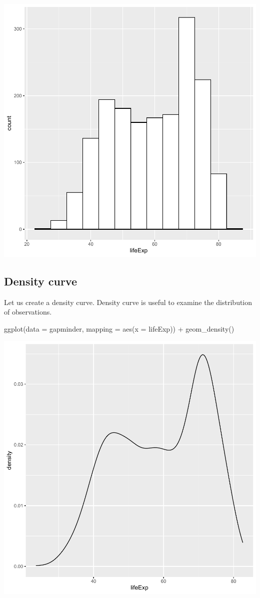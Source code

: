 \documentclass[
]{book}
\makeatletter
\newenvironment{Shaded}{\begin{snugshade}}{\end{snugshade}}
\newcommand{\AttributeTok}[1]{\textcolor[rgb]{0.61,0.61,0.61}{#1}}
\newcommand{\FunctionTok}[1]{\textcolor[rgb]{0,0,0}{#1}}
\newcommand{\NormalTok}[1]{#1}
\newcommand{\SpecialCharTok}[1]{\textcolor[rgb]{0,0,0}{#1}}
\newenvironment{kframe}{%
\medskip{}
\setlength{\fboxsep}{.8em}
 \def\at@end@of@kframe{}%
 \ifinner\ifhmode%
  \def\at@end@of@kframe{\end{minipage}}%
  \begin{minipage}{\columnwidth}%
 \fi\fi%
 \def\FrameCommand##1{\hskip\@totalleftmargin \hskip-\fboxsep
 \colorbox{shadecolor}{##1}\hskip-\fboxsep
     \hskip-\linewidth \hskip-\@totalleftmargin \hskip\columnwidth}%
 \MakeFramed {\advance\hsize-\width
   \@totalleftmargin\z@ \linewidth\hsize
   \@setminipage}}%
 {\par\unskip\endMakeFramed%
 \at@end@of@kframe}
\renewenvironment{Shaded}{\begin{kframe}}{\end{kframe}}
\makeatother
\begin{document}
\begin{center}\includegraphics[width=0.7\linewidth,keepaspectratio]{Multivariable_Data_Analysis_files/figure-latex/unnamed-chunk-75-1} \end{center}

\hypertarget{density-curve}{%
\subsection{Density curve}\label{density-curve}}

Let us create a density curve. Density curve is useful to examine the distribution of observations.

\begin{Shaded}
\begin{Highlighting}[]
\FunctionTok{ggplot}\NormalTok{(}\AttributeTok{data =}\NormalTok{ gapminder, }\AttributeTok{mapping =} \FunctionTok{aes}\NormalTok{(}\AttributeTok{x =}\NormalTok{ lifeExp)) }\SpecialCharTok{+} \FunctionTok{geom\_density}\NormalTok{()}
\end{Highlighting}
\end{Shaded}

\begin{center}\includegraphics[width=0.7\linewidth,keepaspectratio]{Multivariable_Data_Analysis_files/figure-latex/unnamed-chunk-76-1} \end{center}
\end{document}
